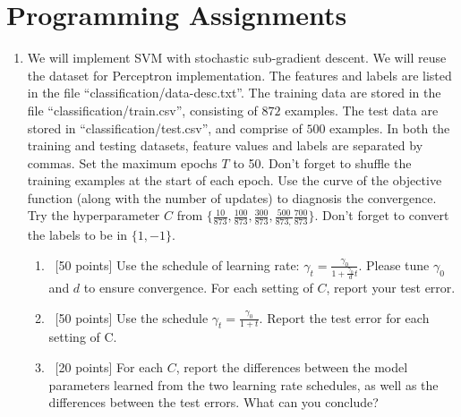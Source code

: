 \documentclass[12pt, fullpage,letterpaper]{article}
\begin{document}
\section{Programming Assignments}
\begin{enumerate}
\item We will implement  SVM with stochastic sub-gradient descent. We will reuse the dataset for Perceptron implementation. The features and labels are listed in the file ``classification/data-desc.txt''. The training data are stored in the file ``classification/train.csv'', consisting of $872$ examples. The test data are stored in ``classification/test.csv'', and comprise of $500$ examples. In both the training and testing datasets, feature values and labels are separated by commas. Set the maximum epochs $T$ to 50. Don't forget to shuffle the training examples at the start of each epoch. Use the curve of the objective function (along with the number of updates) to diagnosis the convergence. Try the hyperparameter $C$ from $\{\frac{10}{873}, \frac{100}{873}, \frac{300}{873}, \frac{500}{873,} \frac{700}{873}\}$. Don't forget to convert the labels to be in $\{1, -1\}$.  
\begin{enumerate}
\item~[50 points] Use the schedule of learning rate: $\gamma_t = \frac{\gamma_0}{1+\frac{\gamma_0}{d}t}$. Please tune $\gamma_0$ and $d$ to ensure convergence. For each setting of $C$, report your test error. 
\item~[50 points] Use the schedule $\gamma_t = \frac{\gamma_0}{1+t}$. Report the test error for each setting of C. 
\item~[20 points] For each $C$, report the differences between the model parameters learned from the two learning rate schedules, as well as the differences between the test errors. What can you conclude? 
\end{enumerate}
\end{enumerate}
\end{document}
